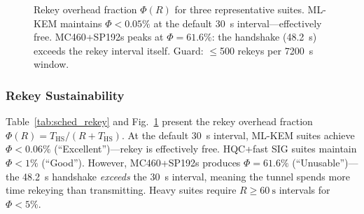 \begin{figure}[!t]
\centering
{}
\caption{Rekey overhead fraction $\Phi(R)$ for three representative
suites.  ML-KEM maintains $\Phi<0.05\%$ at the default \SI{30}{\second}
interval---effectively free.  MC460+SP192s peaks at $\Phi=61.6\%$: the
handshake (\SI{48.2}{\second}) exceeds the rekey interval itself.
Guard: $\leq$500 rekeys per \SI{7200}{\second} window.}
\label{fig:sched_rekey}
\end{figure}

\subsubsection{Rekey Sustainability}
Table~\ref{tab:sched_rekey} and Fig.~\ref{fig:sched_rekey} present
the rekey overhead fraction
$\Phi(R)=T_\text{HS}/(R+T_\text{HS})$.  At the default
\SI{30}{\second} interval, ML-KEM suites achieve $\Phi<0.06\%$
(``Excellent'')---rekey is effectively free.  HQC+fast SIG suites
maintain $\Phi<1\%$ (``Good'').  However, MC460+SP192s produces
$\Phi=61.6\%$ (``Unusable'')---the \SI{48.2}{\second} handshake
\emph{exceeds} the \SI{30}{\second} interval, meaning the tunnel
spends more time rekeying than transmitting.  Heavy suites require
$R\geq\SI{60}{\second}$ intervals for $\Phi<5\%$.

